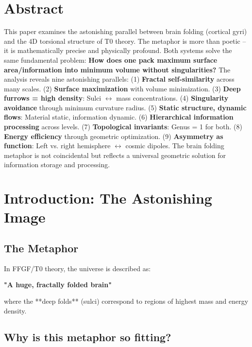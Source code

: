 \section*{Abstract}
		This paper examines the astonishing parallel between brain folding (cortical gyri) and the 4D torsional structure of T0 theory. The metaphor is more than poetic -- it is mathematically precise and physically profound. Both systems solve the same fundamental problem: \textbf{How does one pack maximum surface area/information into minimum volume without singularities?} The analysis reveals nine astonishing parallels: (1) \textbf{Fractal self-similarity} across many scales. (2) \textbf{Surface maximization} with volume minimization. (3) \textbf{Deep furrows = high density}: Sulci $\leftrightarrow$ mass concentrations. (4) \textbf{Singularity avoidance} through minimum curvature radius. (5) \textbf{Static structure, dynamic flows}: Material static, information dynamic. (6) \textbf{Hierarchical information processing} across levels. (7) \textbf{Topological invariants}: Genus = 1 for both. (8) \textbf{Energy efficiency} through geometric optimization. (9) \textbf{Asymmetry as function}: Left vs. right hemisphere $\leftrightarrow$ cosmic dipoles. The brain folding metaphor is not coincidental but reflects a universal geometric solution for information storage and processing.

	
	
	
	\section{Introduction: The Astonishing Image}
	
	\subsection{The Metaphor}
	
	In FFGF/T0 theory, the universe is described as:
	
	\begin{center}
		\textbf{"A huge, fractally folded brain"}
	\end{center}
	
	where the **deep folds** (sulci) correspond to regions of highest mass and energy density.
	
	\subsection{Why is this metaphor so fitting?}
	
